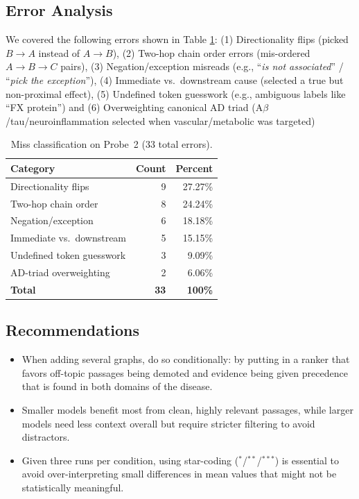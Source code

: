 \subsection{Error Analysis}
We covered the following errors shown in Table \ref{tab:error-breakdown}: (1) {Directionality flips} (picked $B\!\to\!A$ instead of $A\!\to\!B$), (2) {Two-hop chain order errors} (mis-ordered $A\!\to\!B\!\to\!C$ pairs), (3) {Negation/exception misreads} (e.g., ``\emph{is not associated}'' / ``\emph{pick the exception}''), 
(4) {Immediate vs.\ downstream cause} (selected a true but non-proximal effect),
(5) {Undefined token guesswork} (e.g., ambiguous labels like ``FX protein'') and
(6) {Overweighting canonical AD triad} (A$\beta$/tau/neuroinflammation selected when vascular/metabolic was targeted)

\begin{table}[t]
\scriptsize
\centering
\caption{Miss classification on Probe~2 (33 total errors).}
\label{tab:error-breakdown}
\begin{tabular}{lrr}
\toprule
\textbf{Category} & \textbf{Count} & \textbf{Percent} \\
\midrule
Directionality flips & 9 & 27.27\% \\
Two-hop chain order & 8 & 24.24\% \\
Negation/exception & 6 & 18.18\% \\
Immediate vs.\ downstream & 5 & 15.15\% \\
Undefined token guesswork & 3 & 9.09\% \\
AD-triad overweighting & 2 & 6.06\% \\
\midrule
\textbf{Total} & \textbf{33} & \textbf{100\%} \\
\bottomrule
\end{tabular}
\end{table}

\subsection{Recommendations}
\begin{itemize}
  \item When adding several graphs, do so conditionally: by putting in a ranker that favors off-topic passages being demoted and evidence being given precedence that is found in both domains of the disease.
  \item Smaller models benefit most from clean, highly relevant passages, while larger models need less context overall but require stricter filtering to avoid distractors.
  \item Given three runs per condition, using star-coding ($^{*}$/$^{**}$/$^{***}$) is essential to avoid over-interpreting small differences in mean values that might not be statistically meaningful.
\end{itemize}

